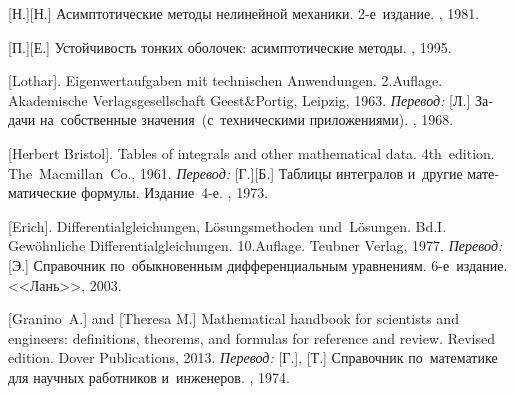 \begin{thebibliography}{123}
\begin{otherlanguage}{russian}
[Н.][Н.] Асимптотические методы нелинейной механики. 2\hbox{-}е~издание. \naukapublisher, 1981. 

[П.][Е.] Устойчивость тонких оболочек: асимптотические методы. \naukapublisher, 1995. 

%
%



[Lothar]. Eigenwertaufgaben mit technischen Anwendungen. 2.\:Auflage. Akademische Verlagsgesellschaft Geest\;\&\;Portig, Leipzig, 1963. 
\emph{Перевод:} [Л.] Задачи на~собственные значения~(с~техническими приложениями). \naukapublisher, 1968. 

[Herbert Bristol]. Tables of integrals and other mathematical data. 4th~edition. The~Macmillan~Co., 1961. 
\emph{Перевод:} [Г.][Б.] Таблицы интегралов и~другие математические формулы. Издание~4\hbox{-}е. \naukapublisher, 1973. 

[Erich]. Differentialgleichungen, Lösungsmethoden und~Lö\-sun\-gen. Bd.\:I. Gewöhnliche Differentialgleichungen. 10.\:Auflage. Teubner Verlag, 1977. 
\emph{Перевод:} [Э.] Справочник по~обыкновенным дифференциальным уравнениям. 6\hbox{-}е~издание. <<Лань>>, 2003. 

[Granino~A.] and [Theresa M.]
Mathematical handbook for scientists and engineers: definitions, theorems, and formulas for reference and review.
Revised edition. Dover Publications, 2013. 
\emph{Перевод:}
[Г.],
[Т.]
Справочник по~математике для научных работников и~инженеров.
\naukapublisher,
1974.


\end{otherlanguage}
\end{thebibliography}
